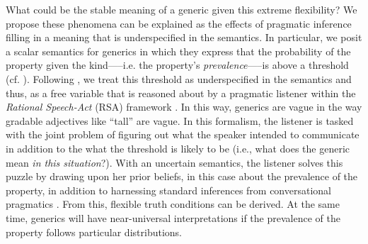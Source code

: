 \documentclass[10pt,letterpaper]{article}
\newcommand{\red}[1]{\textcolor{Red}{#1}}
\begin{document}
%
%
%
%

What could be the stable meaning of a generic given this extreme flexibility? We propose these phenomena can be explained as the effects of pragmatic inference filling in a meaning that is underspecified in the semantics. 
%
In particular, we posit a scalar semantics for generics in which they express that the probability of the property given the kind-----i.e. the property's \emph{prevalence}-----is above a threshold (cf. ). Following , we treat this threshold as underspecified in the semantics and thus, as a free variable that is reasoned about by a pragmatic listener within the \emph{Rational Speech-Act} (RSA) framework \cite{Frank2012,Goodman2013}. In this way, generics are vague in the way gradable adjectives like ``tall'' are vague. In this formalism, the listener is tasked with the joint problem of figuring out what the speaker intended to communicate in addition to the what the threshold is likely to be (i.e., what does the generic mean \emph{in this situation}?). 
%
With an uncertain semantics, the listener solves this puzzle by drawing upon her prior beliefs, in this case about the prevalence of the property, in addition to harnessing standard inferences from conversational pragmatics \cite{Clark1996, Grice1975, Levinson2000}. From this, flexible truth conditions can be derived. At the same time, generics will have near-universal interpretations if the prevalence of the property follows particular distributions.
%
\end{document}
